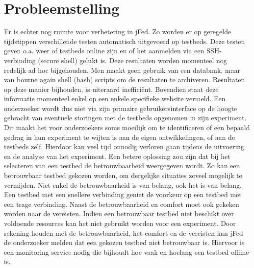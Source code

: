 \section{Probleemstelling}
\npar
Er is echter nog ruimte voor verbetering in jFed. Zo worden er op geregelde tijdstippen verschillende testen automatisch uitgevoerd op testbeds. Deze testen geven o.a. weer of testbeds online zijn en of het aanmelden via een SSH-verbinding (secure shell) gelukt is. Deze resultaten worden momenteel nog redelijk ad hoc bijgehouden. Men maakt geen gebruik van een databank, maar van bourne again shell (bash)  scripts om de resultaten te archiveren. Resultaten op deze manier bijhouden, is uiteraard ineffici\"ent. Bovendien staat deze informatie momenteel enkel op een enkele specifieke website vermeld. 
\npar
Een onderzoeker wordt dus niet via zijn primaire gebruikersinterface op de hoogte gebracht van eventuele storingen met de testbeds opgenomen in zijn experiment. Dit maakt het voor onderzoekers soms moeilijk om te identificeren of een bepaald gedrag in hun experiment te wijten is aan de eigen ontwikkelingen, of aan de testbeds zelf. Hierdoor kan veel tijd onnodig verloren gaan tijdens de uitvoering en de analyse van het experiment. Een betere oplossing zou zijn dat bij het selecteren van een testbed de betrouwbaarheid weergegeven wordt. Zo kan een betrouwbaar testbed gekozen worden, om dergelijke situaties zoveel mogelijk te vermijden.
\npar
Niet enkel de betrouwbaarheid is van belang, ook het  is van belang. Een testbed met een snellere verbinding geniet de voorkeur op een testbed met een trage verbinding. Naast de betrouwbaarheid en comfort moet ook gekeken worden naar de vereisten. Indien een betrouwbaar testbed niet beschikt over voldoende resources kan het niet gebruikt worden voor een experiment.
\npar
Door rekening houden met de betrouwbaarheid, het comfort en de vereisten kan jFed de onderzoeker melden dat een gekozen testbed niet betrouwbaar is. Hiervoor is een monitoring service nodig die bijhoudt hoe vaak en hoelang een testbed offline is.